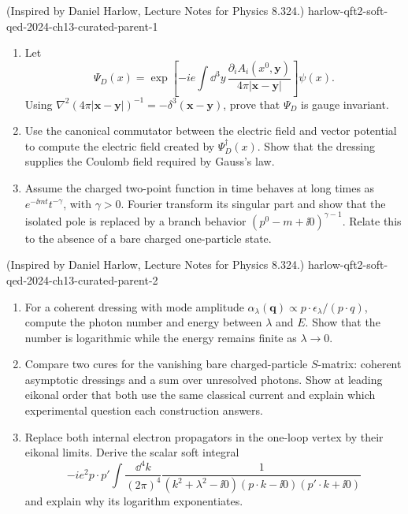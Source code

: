 \begin{enumerate}
  {(Inspired by Daniel Harlow, Lecture Notes for Physics 8.324.)}
  {harlow-qft2-soft-qed-2024-ch13-curated-parent-1}
\begin{enumerate}
\item
Let
\[
 \Psi_D(x)=\exp\left[-ie\int \dd^3y\,
 \frac{\partial_iA_i(x^0,\mathbf y)}{4\pi|\mathbf x-\mathbf y|}\right]\psi(x).
\]
Using \(\nabla^2(4\pi|\mathbf x-\mathbf y|)^{-1}
=-\delta^3(\mathbf x-\mathbf y)\), prove that \(\Psi_D\) is gauge invariant.
\item
Use the canonical commutator between the electric field and vector potential
to compute the electric field created by \(\Psi_D^\dagger(x)\).  Show that
the dressing supplies the Coulomb field required by Gauss's law.
\item
Assume the charged two-point function in time behaves at long times as
\(e^{-\ii mt}t^{-\gamma}\), with \(\gamma>0\).  Fourier transform its singular
part and show that the isolated pole is replaced by a branch behavior
\((p^0-m+\ii0)^{\gamma-1}\).  Relate this to the absence of a bare charged
one-particle state.
\end{enumerate}

  {(Inspired by Daniel Harlow, Lecture Notes for Physics 8.324.)}
  {harlow-qft2-soft-qed-2024-ch13-curated-parent-2}
\begin{enumerate}
\item
For a coherent dressing with mode amplitude
\(\alpha_\lambda(\mathbf q)\propto
p\cdot\epsilon_\lambda/(p\cdot q)\), compute the photon number and energy
between \(\lambda\) and \(E\).  Show that the number is logarithmic while
the energy remains finite as \(\lambda\to0\).
\item
Compare two cures for the vanishing bare charged-particle \(S\)-matrix:
coherent asymptotic dressings and a sum over unresolved photons.  Show at
leading eikonal order that both use the same classical current and explain
which experimental question each construction answers.
\item
Replace both internal electron propagators in the one-loop vertex by their
eikonal limits.  Derive the scalar soft integral
\[
 -ie^2p\cdot p'\int\frac{\dd^4k}{(2\pi)^4}
 \frac1{(k^2+\lambda^2-\ii0)(p\cdot k-\ii0)(p'\cdot k+\ii0)}
\]
and explain why its logarithm exponentiates.
\end{enumerate}


\end{enumerate}

